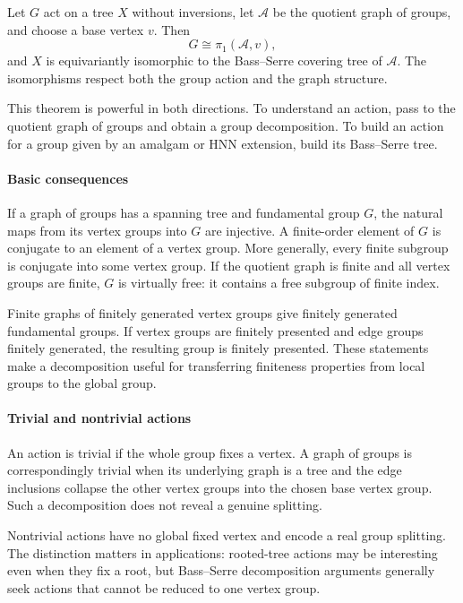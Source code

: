 Let $G$ act on a tree $X$ without inversions, let $\mathcal A$ be the quotient graph of groups, and choose a base vertex $v$. Then
\[
 G\cong\pi_1(\mathcal A,v),
\]
and $X$ is equivariantly isomorphic to the Bass--Serre covering tree of $\mathcal A$. The isomorphisms respect both the group action and the graph structure.

This theorem is powerful in both directions. To understand an action, pass to the quotient graph of groups and obtain a group decomposition. To build an action for a group given by an amalgam or HNN extension, build its Bass--Serre tree.

\paragraph{Basic consequences}

If a graph of groups has a spanning tree and fundamental group $G$, the natural maps from its vertex groups into $G$ are injective. A finite-order element of $G$ is conjugate to an element of a vertex group. More generally, every finite subgroup is conjugate into some vertex group. If the quotient graph is finite and all vertex groups are finite, $G$ is virtually free: it contains a free subgroup of finite index.

Finite graphs of finitely generated vertex groups give finitely generated fundamental groups. If vertex groups are finitely presented and edge groups finitely generated, the resulting group is finitely presented. These statements make a decomposition useful for transferring finiteness properties from local groups to the global group.

\paragraph{Trivial and nontrivial actions}

An action is trivial if the whole group fixes a vertex. A graph of groups is correspondingly trivial when its underlying graph is a tree and the edge inclusions collapse the other vertex groups into the chosen base vertex group. Such a decomposition does not reveal a genuine splitting.

Nontrivial actions have no global fixed vertex and encode a real group splitting. The distinction matters in applications: rooted-tree actions may be interesting even when they fix a root, but Bass--Serre decomposition arguments generally seek actions that cannot be reduced to one vertex group.

